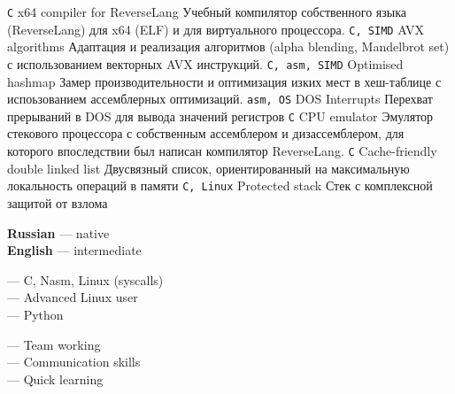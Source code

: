 \documentclass[9pt]{developercv} %
\begin{document}

\begin{entrylist}
	\entry
        {\texttt{C}}
		{x64 compiler for ReverseLang}
		{}
		{Учебный компилятор собственного языка (ReverseLang) для x64 (ELF) и для виртуального процессора.}
	\entry
		{\texttt{C, SIMD}}
		{AVX algorithms}
		{}
		{Адаптация и реализация алгоритмов (alpha blending, Mandelbrot set) с использованием векторных AVX инструкций.}
    \entry
		{\texttt{C, asm, SIMD}}
		{Optimised hashmap}
		{}
		{Замер производительности и оптимизация изких мест в хеш-таблице с испоьзованием ассемблерных оптимизаций.}
    \entry
		{\texttt{asm, OS}}
		{DOS Interrupts}
		{}
		{Перехват прерываний в DOS для вывода значений регистров}
  	\entry
		{\texttt{C}}
		{CPU emulator}
		{}
		{Эмулятор стекового процессора с собственным ассемблером и дизассемблером, для которого впоследствии был написан компилятор ReverseLang.}
    \entry
        {\texttt{C}}
		{Cache-friendly double linked list}
		{}
		{Двусвязный список, ориентированный на максимальную локальность операций в памяти}
    \entry
		{\texttt{C, Linux}}
		{Protected stack}
		{}
		{Стек с комплексной защитой от взлома}
\end{entrylist}


\begin{minipage}[t]{0.3\textwidth}
	\vspace{-\baselineskip} %

	
	\textbf{Russian} — native\\
	\textbf{English} — intermediate\\
\end{minipage}
\hfill
\begin{minipage}[t]{0.3\textwidth}
	\vspace{-\baselineskip} %
	
    — C, Nasm, Linux (syscalls)\\
	— Advanced Linux user\\
    — Python
\end{minipage}
\hfill
\begin{minipage}[t]{0.3\textwidth}
	\vspace{-\baselineskip} %
	
	— Team working\\
    — Communication skills\\
    — Quick learning
\end{minipage}
\end{document}
